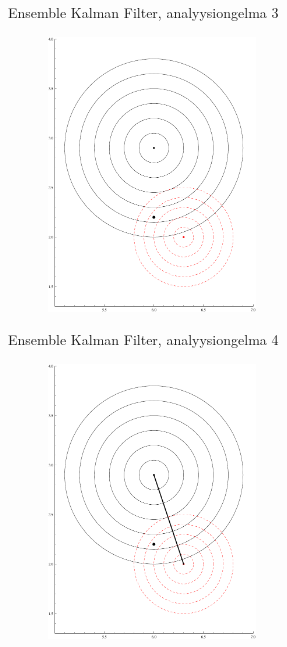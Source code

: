 \documentclass{beamer}
\begin{document}
\begin{frame}{Ensemble Kalman Filter, analyysiongelma 3}

\begin{figure}
\includegraphics[width=5.5cm]{enkf6.pdf}
\end{figure}

\end{frame}

\begin{frame}{Ensemble Kalman Filter, analyysiongelma 4}

\begin{figure}
\includegraphics[width=5.5cm]{enkf7.pdf}
\end{figure}

\end{frame}
\end{document}
